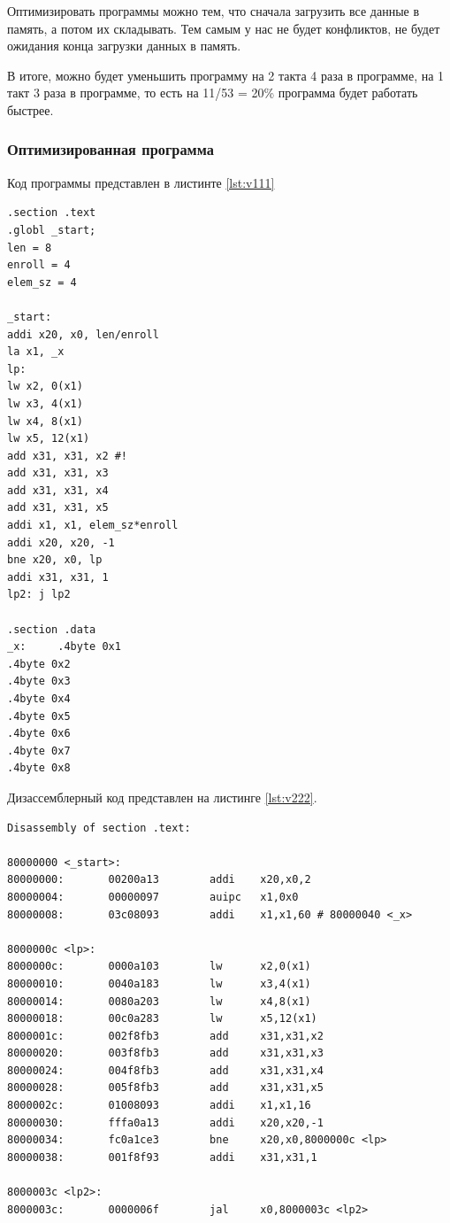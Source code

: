 Оптимизировать программы можно тем, что сначала загрузить все данные в память, а потом их складывать. Тем самым у нас не будет конфликтов, не будет ожидания конца загрузки данных в память.

В итоге, можно будет уменьшить программу на 2 такта 4 раза в программе, на 1 такт 3 раза в программе, то есть на 11/53 = 20\% программа будет работать быстрее.

\clearpage

\subsubsection*{Оптимизированная программа}

Код программы представлен в листинте \ref{lst:v111}

\begin{lstlisting}[label=lst:v111,caption=Код программы 9 варианта(оптимизированный)]
.section .text
.globl _start;
len = 8
enroll = 4 
elem_sz = 4 

_start:
addi x20, x0, len/enroll
la x1, _x
lp:
lw x2, 0(x1)
lw x3, 4(x1)
lw x4, 8(x1)
lw x5, 12(x1)
add x31, x31, x2 #!
add x31, x31, x3
add x31, x31, x4
add x31, x31, x5
addi x1, x1, elem_sz*enroll
addi x20, x20, -1
bne x20, x0, lp
addi x31, x31, 1
lp2: j lp2

.section .data
_x:     .4byte 0x1
.4byte 0x2
.4byte 0x3
.4byte 0x4
.4byte 0x5
.4byte 0x6
.4byte 0x7
.4byte 0x8
\end{lstlisting}

\clearpage

Дизассемблерный код представлен на листинге \ref{lst:v222}.

\begin{lstlisting}[label=lst:v222,caption=Дизассемблированный код 9 варинта (оптимизированный)]
Disassembly of section .text:

80000000 <_start>:
80000000:       00200a13        addi    x20,x0,2
80000004:       00000097        auipc   x1,0x0
80000008:       03c08093        addi    x1,x1,60 # 80000040 <_x>

8000000c <lp>:
8000000c:       0000a103        lw      x2,0(x1)
80000010:       0040a183        lw      x3,4(x1)
80000014:       0080a203        lw      x4,8(x1)
80000018:       00c0a283        lw      x5,12(x1)
8000001c:       002f8fb3        add     x31,x31,x2
80000020:       003f8fb3        add     x31,x31,x3
80000024:       004f8fb3        add     x31,x31,x4
80000028:       005f8fb3        add     x31,x31,x5
8000002c:       01008093        addi    x1,x1,16
80000030:       fffa0a13        addi    x20,x20,-1
80000034:       fc0a1ce3        bne     x20,x0,8000000c <lp>
80000038:       001f8f93        addi    x31,x31,1

8000003c <lp2>:
8000003c:       0000006f        jal     x0,8000003c <lp2>
\end{lstlisting}
\clearpage

